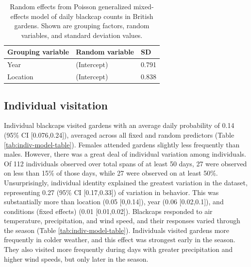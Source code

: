 \documentclass[a4paper, twoside]{templates/ociamthesis}
\begin{document}
\begin{table}[t]

\caption{\label{tab:daily-model-table}Random effects from Poisson generalized mixed-effects model of daily blackcap counts in British gardens. Shown are grouping factors, random variables, and standard deviation values.}
\centering
\begin{tabular}{l|l|l}
\hline
Grouping variable & Random variable & SD\\
\hline
Year & (Intercept) & 0.791\\
\hline
Location & (Intercept) & 0.838\\
\hline
\end{tabular}
\end{table}

\hypertarget{individual-visitation-1}{%
\subsection{Individual visitation}\label{individual-visitation-1}}

Individual blackcaps visited gardens with an average daily probability of 0.14 (95\% CI {[}0.076,0.24{]}), averaged across all fixed and random predictors (Table \ref{tab:indiv-model-table}). Females attended gardens slightly less frequently than males. However, there was a great deal of individual variation among individuals. Of 112 individuals observed over total spans of at least 50 days, 27 were observed on less than 15\% of those days, while 27 were observed on at least 50\%. Unsurprisingly, individual identity explained the greatest variation in the dataset, representing 0.27 (95\% CI {[}0.17,0.33{]}) of variation in behavior. This was substantially more than location (0.05 {[}0,0.14{]}), year (0.06 {[}0.02,0.1{]}), and conditions (fixed effects) (0.01 {[}0.01,0.02{]}). Blackcaps responded to air temperature, precipitation, and wind speed, and their responses varied through the season (Table \ref{tab:indiv-model-table}). Individuals visited gardens more frequently in colder weather, and this effect was strongest early in the season. They also visited more frequently during days with greater precipitation and higher wind speeds, but only later in the season.
\end{document}
